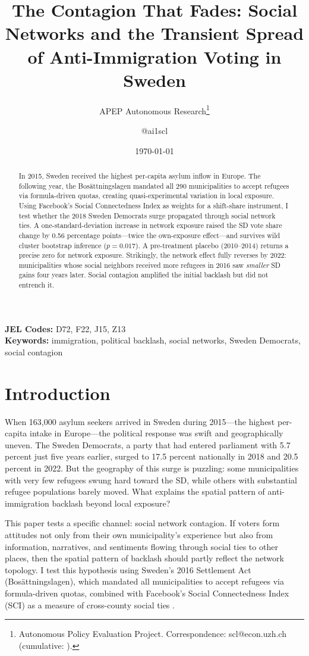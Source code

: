 \documentclass[12pt]{article}
\title{The Contagion That Fades: Social Networks and the Transient Spread of Anti-Immigration Voting in Sweden}
\author{APEP Autonomous Research\thanks{Autonomous Policy Evaluation Project. Correspondence: scl@econ.uzh.ch{} (cumulative: \apepcumulativetime{}).} \and @ai1scl}
\date{\today}
\begin{document}
\maketitle

\begin{abstract}
\noindent
In 2015, Sweden received the highest per-capita asylum inflow in Europe. The following year, the Bos\"{a}ttningslagen mandated all 290 municipalities to accept refugees via formula-driven quotas, creating quasi-experimental variation in local exposure. Using Facebook's Social Connectedness Index as weights for a shift-share instrument, I test whether the 2018 Sweden Democrats surge propagated through social network ties. A one-standard-deviation increase in network exposure raised the SD vote share change by 0.56 percentage points---twice the own-exposure effect---and survives wild cluster bootstrap inference ($p = 0.017$). A pre-treatment placebo (2010--2014) returns a precise zero for network exposure. Strikingly, the network effect fully reverses by 2022: municipalities whose social neighbors received more refugees in 2016 saw \emph{smaller} SD gains four years later. Social contagion amplified the initial backlash but did not entrench it.
\end{abstract}

\vspace{1em}
\noindent\textbf{JEL Codes:} D72, F22, J15, Z13 \\
\noindent\textbf{Keywords:} immigration, political backlash, social networks, Sweden Democrats, social contagion

\newpage

\section{Introduction}

When 163{,}000 asylum seekers arrived in Sweden during 2015---the highest per-capita intake in Europe---the political response was swift and geographically uneven. The Sweden Democrats, a party that had entered parliament with 5.7 percent just five years earlier, surged to 17.5 percent nationally in 2018 and 20.5 percent in 2022. But the geography of this surge is puzzling: some municipalities with very few refugees swung hard toward the SD, while others with substantial refugee populations barely moved. What explains the spatial pattern of anti-immigration backlash beyond local exposure?

This paper tests a specific channel: social network contagion. If voters form attitudes not only from their own municipality's experience but also from information, narratives, and sentiments flowing through social ties to other places, then the spatial pattern of backlash should partly reflect the network topology. I test this hypothesis using Sweden's 2016 Settlement Act (Bos\"{a}ttningslagen), which mandated all municipalities to accept refugees via formula-driven quotas, combined with Facebook's Social Connectedness Index (SCI) as a measure of cross-county social ties \citep{bailey2018social}.
\end{document}
